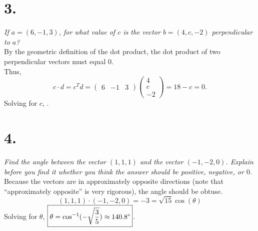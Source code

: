 \documentclass[12pt]{article}
\begin{document}
\section*{3.}
\textit{If $a = (6, -1, 3)$, for what value of $c$ is the vector
$b = (4, c, -2)$ perpendicular to $a$?}\\[\baselineskip]
By the geometric definition of the dot product, the dot product of two
perpendicular vectors must equal $0$. \\[\baselineskip]
Thus,
\begin{equation*}
	c \cdot d = c^T d =
	\begin{pmatrix} 6 & -1 & 3 \end{pmatrix}
	\begin{pmatrix} 4 \\ c \\ -2 \end{pmatrix}
	= 18 - c = 0.
\end{equation*}
Solving for $c$, .

\section*{4.}
\textit{Find the angle between the vector $(1, 1, 1)$ and the vector
$(-1, -2, 0)$. Explain before you find it whether you think the answer should
be positive, negative, or $0$.} \\[\baselineskip]
Because the vectors are in approximately opposite directions (note that
``approximately opposite'' is very rigorous), the angle should be obtuse.
\begin{equation*}
	(1, 1, 1) \cdot (-1, -2, 0)
	=
	-3
	=
	\sqrt{15} \cos(\theta)
\end{equation*}
Solving for $\theta$,
$\boxed{\theta = \cos^{-1}(-\sqrt{\frac{3}{5}}) \approx 140.8 \degree}$.
\end{document}
